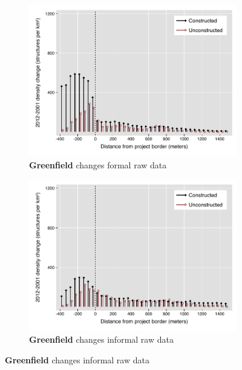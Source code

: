 \documentclass[12pt]{article}
\begin{document}
\begin{figure}
\begin{subfigure}[b]{0.48\textwidth}
        \end{subfigure}
        \begin{subfigure}[b]{0.48\textwidth}
                    \caption[Network2]%
            {{\footnotesize \textbf{Greenfield} changes formal  raw data}}    
            \label{fig:prefor}
            \centering
            \includegraphics[width=\textwidth,trim={0.3cm .3cm 0.1cm 0cm}, clip=true]{figures/bblu_for_rawchanges_4_1_30k.pdf}

        \end{subfigure}
        \hfill
        \begin{subfigure}[b]{0.48\textwidth}  
                    \caption[]%
            {{\footnotesize \textbf{Greenfield} changes informal raw data }}     
            \label{fig:preinf}
            \centering 
            \includegraphics[width=\textwidth,trim={0.3cm .3cm 0.1cm 0cm}, clip=true]{figures/bblu_inf_rawchanges_4_1_30k.pdf}


\end{subfigure}
\end{figure}
\end{document}

